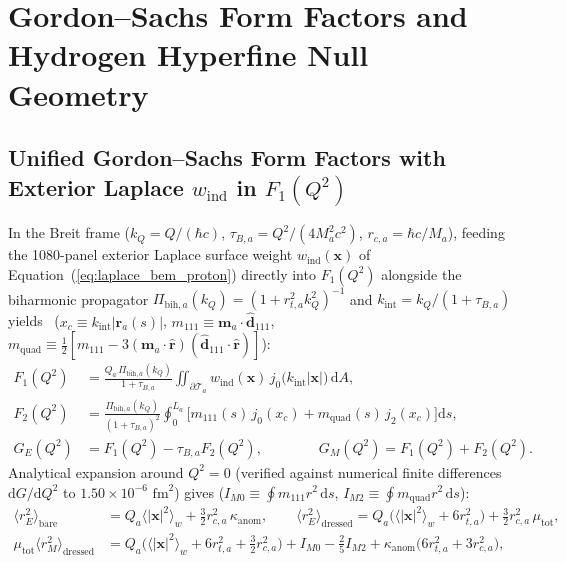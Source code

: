 \documentclass[11pt, a4paper]{article}
\DeclareRobustCommand{\dd}{\mathrm{d}}
\begin{document}
\section{Gordon--Sachs Form Factors and Hydrogen Hyperfine Null Geometry}
\label{sec:form_factors}

\subsection{\texorpdfstring{Unified Gordon--Sachs Form Factors with Exterior Laplace $w_{\mathrm{ind}}$ in $F_1(Q^2)$}{Unified Gordon-Sachs Form Factors with Exterior Laplace Induction in F1}}
In the Breit frame ($k_Q = Q/(\hbar c)$, $\tau_{B,a} = Q^2/(4M_a^2 c^2)$, $r_{c,a} = \hbar c/M_a$), feeding the 1080-panel exterior Laplace surface weight $w_{\mathrm{ind}}(\mathbf{x})$ of Equation~(\ref{eq:laplace_bem_proton}) directly into $F_1(Q^2)$ alongside the biharmonic propagator $\Pi_{\mathrm{bih},a}(k_Q) = (1 + r_{t,a}^2 k_Q^2)^{-1}$ and $k_{\mathrm{int}} = k_Q/(1 + \tau_{B,a})$ yields~\cite{foldy1952,sachs1962} ($x_c \equiv k_{\mathrm{int}}|\mathbf{r}_a(s)|$, $m_{111} \equiv \mathbf{m}_a\cdot\hat{\mathbf{d}}_{111}$, $m_{\mathrm{quad}} \equiv \frac{1}{2}[m_{111} - 3(\mathbf{m}_a\cdot\hat{\mathbf{r}})(\hat{\mathbf{d}}_{111}\cdot\hat{\mathbf{r}})]$):
\begin{align}
    F_1(Q^2) &= \frac{Q_a\,\Pi_{\mathrm{bih},a}(k_Q)}{1 + \tau_{B,a}}\iint_{\partial\mathcal{T}_a} w_{\mathrm{ind}}(\mathbf{x})\,j_0\big(k_{\mathrm{int}}|\mathbf{x}|\big)\,\dd A, \label{eq:F1_exact}\\
    F_2(Q^2) &= \frac{\Pi_{\mathrm{bih},a}(k_Q)}{(1 + \tau_{B,a})^2}\oint_0^{L_a} \Big[m_{111}(s)\,j_0(x_c) + m_{\mathrm{quad}}(s)\,j_2(x_c)\Big]\dd s, \label{eq:F2_exact}\\
    G_E(Q^2) &= F_1(Q^2) - \tau_{B,a} F_2(Q^2), \qquad\qquad G_M(Q^2) = F_1(Q^2) + F_2(Q^2). \label{eq:sachs_exact}
\end{align}
Analytical expansion around $Q^2 = 0$ (verified against numerical finite differences $\dd G/\dd Q^2$ to $1.50 \times 10^{-6}\text{ fm}^2$) gives ($I_{M0} \equiv \oint m_{111}r^2\,\dd s$, $I_{M2} \equiv \oint m_{\mathrm{quad}}r^2\,\dd s$):
\begin{align}
    \langle r_E^2\rangle_{\mathrm{bare}} &= Q_a\langle |\mathbf{x}|^2\rangle_{w} + \frac{3}{2}r_{c,a}^2\,\kappa_{\mathrm{anom}}, \qquad
    \langle r_E^2\rangle_{\mathrm{dressed}} = Q_a\Big(\langle |\mathbf{x}|^2\rangle_{w} + 6r_{t,a}^2\Big) + \frac{3}{2}r_{c,a}^2\,\mu_{\mathrm{tot}}, \label{eq:re2_analytic}\\
    \mu_{\mathrm{tot}}\langle r_M^2\rangle_{\mathrm{dressed}} &= Q_a\Big(\langle |\mathbf{x}|^2\rangle_{w} + 6r_{t,a}^2 + \frac{3}{2}r_{c,a}^2\Big) + I_{M0} - \frac{2}{5}I_{M2} + \kappa_{\mathrm{anom}}\big(6r_{t,a}^2 + 3r_{c,a}^2\big), \label{eq:rm2_analytic}
\end{align}
\end{document}
